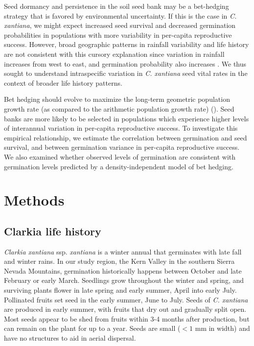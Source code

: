 \documentclass[12pt, oneside, titlepage]{article}   	%
\begin{document}
{Seed dormancy and persistence in the soil seed bank may be a bet-hedging strategy that is favored by environmental uncertainty. If this is the case in \textit{C. xantiana}, we might expect increased seed survival and decreased germination probabilities in populations with more variability in per-capita reproductive success. However, broad geographic patterns in rainfall variability and life history are not consistent with this cursory explanation since variation in rainfall increases from west to east, and germination probability also increases \cite{eckhart2011}. We thus sought to understand intraspecific variation in \textit{C. xantiana} seed vital rates in the context of broader life history patterns. 

Bet hedging should evolve to maximize the long-term geometric population growth rate (as compared to the arithmetic population growth rate) (\cite{cohen1966,cohen1968,ellner1985,ellner1985a}). Seed banks are more likely to be selected in populations which experience higher levels of interannual variation in per-capita reproductive success. To investigate this empirical relationship, we estimate the correlation between germination and seed survival, and between germination variance in per-capita reproductive success. We also examined whether observed levels of germination are consistent with germination levels predicted by a density-independent model of bet hedging. 
\fi




\section{Methods}

\subsection{Clarkia life history}

\textit{Clarkia xantiana} ssp. \textit{xantiana} is a winter annual that germinates with late fall and winter rains. In our study region, the Kern Valley in the southern Sierra Nevada Mountains, germination historically happens between October and late February or early March. Seedlings grow throughout the winter and spring, and surviving plants flower in late spring and early summer, April into early July. Pollinated fruits set seed in the early summer, June to July. Seeds of \textit{C. xantiana} are produced in early summer, with fruits that dry out and gradually split open. Most seeds appear to be shed from fruits within 3-4 months after production, but can remain on the plant for up to a year. Seeds are small ($<1$ mm in width) and have no structures to aid in aerial dispersal. 

}
\end{document}
